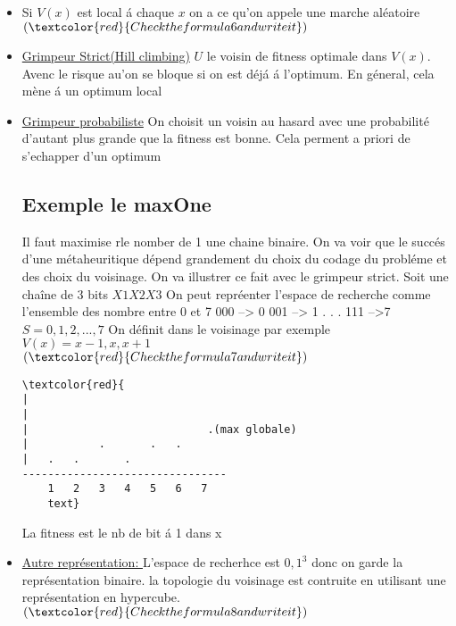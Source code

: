 \begin{itemize}
\paragraph*{Recherche al\'eatoire :} $U$ choisit au hasard dans $V(x)$ le successeurm ind\'ependament de la valeur de la $FITNESS$ \\
- Si $V(x) = S$ on a la recherche al\'eatoire proposant  dite.
\item Si $V(x)$ est local  \'a chaque $x$ on a ce qu'on appele une marche al\'eatoire 
$(\textcolor{red}{Check the formula 6 and write it})$
\item\underline{Grimpeur Strict(Hill climbing)}
$U$ le voisin de fitness optimale dans $V(x)$. Avenc le risque au'on se bloque si on est d\'ej\'a \'a l'optimum.
En g\'eneral, cela m\`ene \'a un optimum local

\item \underline{Grimpeur probabiliste}
On choisit un voisin au hasard avec une probabilit\'e d'autant plus grande que la fitness est bonne.
Cela perment a priori de s'echapper d'un optimum

\subsection{Exemple le maxOne}
Il faut maximise rle nomber de 1 une chaine binaire.
On va voir que le succ\'es d'une m\'etaheuritique d\'epend grandement du choix du codage du probl\'eme et des choix du voisinage.
On va illustrer ce fait avec le grimpeur strict.
Soit une cha\^ine de 3 bits $X1X2X3$
On peut repr\'eenter l'espace de recherche comme l'ensemble des nombre entre 0 et 7 
000 --> 0
001 --> 1
. . . 
111 -->7
$S = {0, 1, 2, ..., 7}$
On d\'efinit dans le voisinage par exemple $V(x)={x-1, x, x+1}$\\
$(\textcolor{red}{Check the formula 7 and write it})$\\
\begin{lstlisting}
\textcolor{red}{
|
|
|                            .(max globale)
|           .       .   .   
|   .   .       .   
--------------------------------
    1   2   3   4   5   6   7
    text}
\end{lstlisting}
La fitness est le nb de bit \'a 1 dans x

\item\underline{Autre repr\'esentation: } L'espace de recherhce est ${0,1}^3$
donc on garde la repr\'esentation binaire.
la topologie du voisinage est contruite en utilisant une repr\'esentation en hypercube.\\
$(\textcolor{red}{Check the formula 8 and write it})$


\end{itemize}
